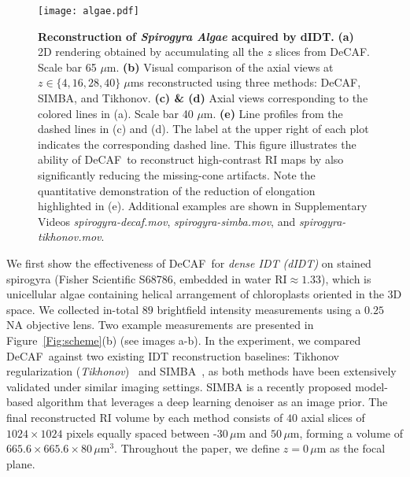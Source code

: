 \documentclass[11pt]{article}
\theoremstyle{plain} %
\def\proposed{DeCAF}
\begin{document}
\begin{figure}[t!]
\begin{center}
\texttt{[image: algae.pdf]}
\end{center}
\caption{
\textbf{Reconstruction of \emph{Spirogyra Algae} acquired by dIDT.} \textbf{(a)} 2D rendering obtained by accumulating all the $z$ slices from \proposed. Scale bar 65 $\mu$m.
\textbf{(b)} Visual comparison of the axial views at $z\in\{4, 16, 28, 40\}\;\mu$ms reconstructed using three methods: \proposed, SIMBA, and Tikhonov. 
\textbf{(c) \& (d)} Axial views corresponding to the colored lines in (a). Scale bar 40 $\mu$m.
\textbf{(e)} Line profiles from the dashed lines in (c) and (d). The label at the upper right of each plot indicates the corresponding dashed line. 
This figure illustrates the ability of \proposed~to reconstruct high-contrast RI maps by also significantly reducing the missing-cone artifacts. Note the quantitative demonstration of the reduction of elongation highlighted in (e).
Additional examples are shown in Supplementary Videos \emph{spirogyra-decaf.mov}, \emph{spirogyra-simba.mov}, and \emph{spirogyra-tikhonov.mov}.
} 
\label{Fig:spirogyra}
\end{figure}

We first show the effectiveness of \proposed~for \emph{dense IDT (dIDT)} on stained spirogyra (Fisher Scientific S68786, embedded in water $\text{RI}\approx1.33$), which is unicellular algae containing helical arrangement of chloroplasts oriented in the 3D space.
We collected in-total $89$ brightfield intensity measurements using a $0.25$ NA objective lens. Two example measurements  are presented in  Figure~\ref{Fig:scheme}(b) (see images a-b).
In the experiment, we compared \proposed~against two existing IDT reconstruction baselines: Tikhonov regularization (\emph{Tikhonov})~\cite{Ling.etal18} and SIMBA~\cite{Wu.etal2020}, as both methods have been extensively validated under similar imaging settings.
SIMBA is a recently proposed model-based algorithm that leverages a deep learning denoiser as an image prior.
The final reconstructed RI volume by each method consists of $40$ axial slices of $1024\times1024$ pixels equally spaced between -$30\,\mu$m and $50\,\mu$m, forming a volume of $665.6\times665.6\times80\,\mu$m$^3$.
Throughout the paper, we define $z=0\,\mu$m as the focal plane.
\end{document}
